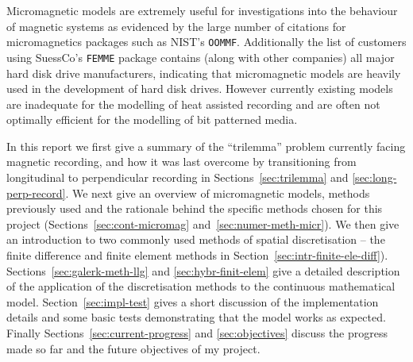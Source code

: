 Micromagnetic models are extremely useful for investigations into the behaviour of magnetic systems as evidenced by the large number of citations for micromagnetics packages such as NIST's \texttt{OOMMF}\cite{oommf-website}. Additionally the list of customers using SuessCo's \texttt{FEMME} package\cite{suessco-website} contains (along with other companies) all major hard disk drive manufacturers, indicating that micromagnetic models are heavily used in the development of hard disk drives. However currently existing models are inadequate for the modelling of heat assisted recording and are often not optimally efficient for the modelling of bit patterned media.

In this report we first give a summary of the ``trilemma'' problem currently facing magnetic recording, and how it was last overcome by transitioning from longitudinal to perpendicular recording in Sections~\ref{sec:trilemma} and \ref{sec:long-perp-record}. We next give an overview of micromagnetic models, methods previously used and the rationale behind the specific methods chosen for this project (Sections~\ref{sec:cont-micromag} and~\ref{sec:numer-meth-micr}). We then give an introduction to two commonly used methods of spatial discretisation -- the finite difference and finite element methods in Section~\ref{sec:intr-finite-ele-diff}). Sections~\ref{sec:galerk-meth-llg} and \ref{sec:hybr-finit-elem} give a detailed description of the application of the discretisation methods to the continuous mathematical model. Section~\ref{sec:impl-test} gives a short discussion of the implementation details and some basic tests demonstrating that the model works as expected. Finally Sections~\ref{sec:current-progress} and \ref{sec:objectives} discuss the progress made so far and the future objectives of my project.






